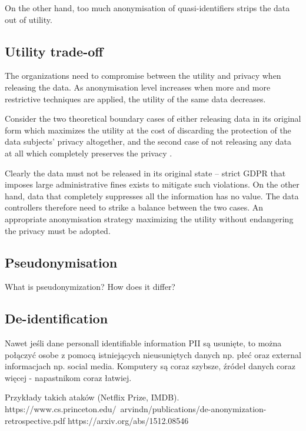 \documentclass[a4paper,twoside,12pt]{book}
\begin{document}
On the other hand, too much anonymisation of quasi-identifiers strips the data out of utility.

\subsection{Utility trade-off}

The organizations need to compromise between the utility and privacy when releasing the data. As anonymisation level increases when more and more restrictive techniques are applied, the utility of the same data decreases.

Consider the two theoretical boundary cases of either releasing data in its original form which maximizes the utility at the cost of discarding the protection of the data subjects' privacy altogether, and the second case of not releasing any data at all which completely preserves the privacy \cite{bib:privacy_digital_world}.

Clearly the data must not be released in its original state – strict GDPR that imposes large administrative fines \cite{bib:art83} exists to mitigate such violations. On the other hand, data that completely suppresses all the information has no value. The data controllers therefore need to strike a balance between the two cases. An appropriate anonymisation strategy maximizing the utility without endangering the privacy must be adopted.

\subsection{Pseudonymisation}

\color{blue}
What is pseudonymization? How does it differ?
\color{black}

\subsection{De-identification}

\color{blue}
Nawet jeśli dane personall identifiable information PII są usunięte, to można połączyć osobe z pomocą istniejących nieusuniętych danych np. płeć oraz external informacjach np. social media. Komputery są coraz szybsze, źródeł danych coraz więcej - napastnikom coraz łatwiej.

Przykłady takich ataków (Netflix Prize, IMDB).
https://www.cs.princeton.edu/~arvindn/publications/de-anonymization-retrospective.pdf
https://arxiv.org/abs/1512.08546
\end{document}
